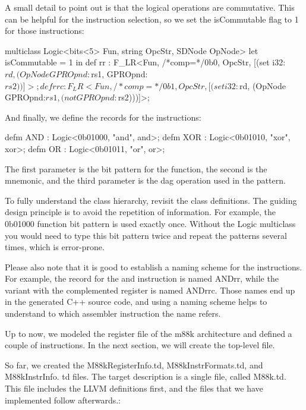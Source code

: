 A small detail to point out is that the logical operations are commutative. This can be helpful for the instruction selection, so we set the isCommutable flag to 1 for those instructions:

\begin{cpp}
multiclass Logic<bits<5> Fun, string OpcStr, SDNode OpNode> {
    let isCommutable = 1 in
    def rr : F_LR<Fun, /*comp=*/0b0, OpcStr,
                    [(set i32:$rd,
                    (OpNode GPROpnd:$rs1, GPROpnd:$rs2))]>;
    def rrc : F_LR<Fun, /*comp=*/0b1, OpcStr,
                    [(set i32:$rd,
                    (OpNode GPROpnd:$rs1, (not GPROpnd:$rs2)))]>;
}
\end{cpp}

And finally, we define the records for the instructions:

\begin{cpp}
defm AND : Logic<0b01000, "and", and>;
defm XOR : Logic<0b01010, "xor", xor>;
defm OR : Logic<0b01011, "or", or>;
\end{cpp}

The first parameter is the bit pattern for the function, the second is the mnemonic, and the third parameter is the dag operation used in the pattern.

To fully understand the class hierarchy, revisit the class definitions. The guiding design principle is to avoid the repetition of information. For example, the 0b01000 function bit pattern is used exactly once. Without the Logic multiclass you would need to type this bit pattern twice and repeat the patterns several times, which is error-prone.

Please also note that it is good to establish a naming scheme for the instructions. For example, the record for the and instruction is named ANDrr, while the variant with the complemented register is named ANDrrc. Those names end up in the generated C++ source code, and using a naming scheme helps to understand to which assembler instruction the name refers.

Up to now, we modeled the register file of the m88k architecture and defined a couple of instructions. In the next section, we will create the top-level file.


So far, we created the M88kRegisterInfo.td, M88kInstrFormats.td, and M88kInstrInfo. td files. The target description is a single file, called M88k.td. This file includes the LLVM definitions first, and the files that we have implemented follow afterwards.:


